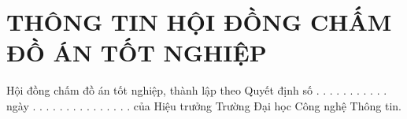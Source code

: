 \chapter*{THÔNG TIN HỘI ĐỒNG CHẤM ĐỒ ÁN TỐT NGHIỆP}

Hội đồng chấm đồ án tốt nghiệp, thành lập theo Quyết định số . . . . . . . . . . . ngày  . . . . . . . . . . . . . . . của Hiệu trưởng Trường Đại học Công nghệ Thông tin.
